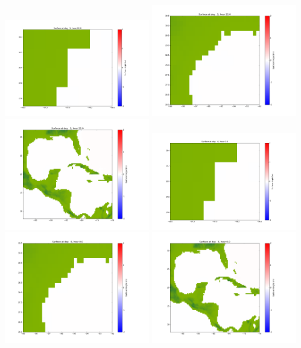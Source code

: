 \documentclass[11pt]{article}
\begin{document}
\vskip 10pt 
\includegraphics[width=0.475\textwidth]{frame0095fig1001.png}
\includegraphics[width=0.475\textwidth]{frame0095fig1002.png}
\vskip 10pt 
\includegraphics[width=0.475\textwidth]{frame0095fig1003.png}
\vskip 10pt 
\includegraphics[width=0.475\textwidth]{frame0096fig1001.png}
\includegraphics[width=0.475\textwidth]{frame0096fig1002.png}
\vskip 10pt 
\includegraphics[width=0.475\textwidth]{frame0096fig1003.png}
\end{document}

